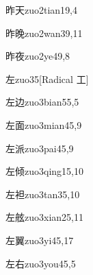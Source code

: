 \begin{verbete}{昨天}{zuo2tian1}{9,4}
\end{verbete}

\begin{verbete}{昨晚}{zuo2wan3}{9,11}
\end{verbete}

\begin{verbete}{昨夜}{zuo2ye4}{9,8}
\end{verbete}

\begin{verbete}{左}{zuo3}{5}[Radical 工]
\end{verbete}

\begin{verbete}{左边}{zuo3bian5}{5,5}
\end{verbete}

\begin{verbete}{左面}{zuo3mian4}{5,9}
\end{verbete}

\begin{verbete}{左派}{zuo3pai4}{5,9}
\end{verbete}

\begin{verbete}{左倾}{zuo3qing1}{5,10}
\end{verbete}

\begin{verbete}{左袒}{zuo3tan3}{5,10}
\end{verbete}

\begin{verbete}{左舷}{zuo3xian2}{5,11}
\end{verbete}

\begin{verbete}{左翼}{zuo3yi4}{5,17}
\end{verbete}

\begin{verbete}{左右}{zuo3you4}{5,5}
\end{verbete}

